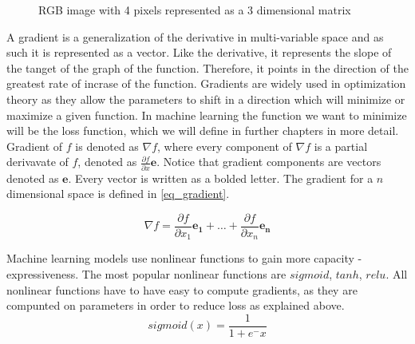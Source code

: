 \documentclass[times, utf8, diplomski]{fer}
\begin{document}
\begin{figure}
\centering
{}
\caption{RGB image with 4 pixels  represented as a 3 dimensional matrix}
\label{fig:image_matrix}
\end{figure}

A gradient is a generalization of the derivative in multi-variable space and as such it is represented as a vector. Like the derivative, it represents the slope of the tanget of the graph of the function. Therefore, it points in the direction of the greatest rate of incrase of the function. Gradients are widely used in optimization theory as they allow the parameters to shift in a direction which will minimize or maximize a given function. In machine learning the function we want to minimize will be the loss function, which we will define in further chapters in more detail. Gradient of $f$ is denoted as $\nabla{f}$, where every component of $\nabla{f}$ is a partial derivavate of $f$, denoted as $\frac{\partial{f}}{\partial{x}}\mathbf{e}$. Notice that gradient components are vectors denoted as $\mathbf{e}$. Every vector is written as a bolded letter. The gradient for a $n$ dimensional space is defined in \ref{eq_gradient}.

\begin{equation} \label{eq_gradient}
    \nabla{f}= \frac{\partial{f}}{\partial{x_{1}}}\mathbf{e_1} + \hdots + 	   \frac{\partial{f}}{\partial{x_{n}}}\mathbf{e_n}
\end{equation}

Machine learning models use nonlinear functions to gain more capacity - expressiveness. The most popular nonlinear functions are $sigmoid$, $tanh$, $relu$. All nonlinear functions have to have easy to compute gradients, as they are compunted on parameters in order to reduce loss as explained above. 
\begin{equation} \label{sigmoid}
	sigmoid(x) = \frac{1}{1 + e^-x}
\end{equation}
\end{document}
